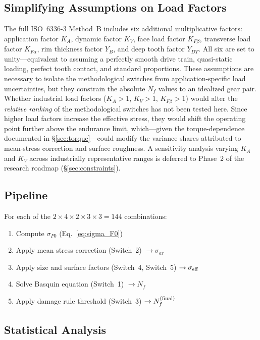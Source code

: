 \documentclass[12pt,a4paper]{article}
\begin{document}
\subsection{Simplifying Assumptions on Load Factors}

The full ISO~6336-3 Method~B includes six additional multiplicative
factors: application factor $K_A$, dynamic factor $K_V$, face load
factor $K_{F\beta}$, transverse load factor $K_{F\alpha}$, rim
thickness factor $Y_B$, and deep tooth factor $Y_{DT}$. All six are set
to unity---equivalent to assuming a perfectly smooth drive train,
quasi-static loading, perfect tooth contact, and standard proportions.
These assumptions are necessary to isolate the methodological switches
from application-specific load uncertainties, but they constrain the
absolute $N_f$ values to an idealized gear pair. Whether industrial load
factors ($K_A > 1$, $K_V > 1$, $K_{F\beta} > 1$) would alter the
\emph{relative ranking} of the methodological switches has not been
tested here. Since higher load factors increase the effective stress,
they would shift the operating point further above the endurance limit,
which---given the torque-dependence documented in
\S\ref{sec:torque}---could modify the variance shares attributed to
mean-stress correction and surface roughness. A sensitivity analysis
varying $K_A$ and $K_V$ across industrially representative ranges is
deferred to Phase~2 of the research roadmap (\S\ref{sec:constraints}).

\subsection{Pipeline}

For each of the $2\times4\times2\times3\times3 = 144$ combinations:
\begin{enumerate}
  \item Compute $\sigma_{F0}$ (Eq.~\ref{eq:sigma_F0})
  \item Apply mean stress correction (Switch~2) $\rightarrow \sigma_{ar}$
  \item Apply size and surface factors (Switch~4, Switch~5)
        $\rightarrow \sigma_{\rm eff}$
  \item Solve Basquin equation (Switch~1) $\rightarrow N_f$
  \item Apply damage rule threshold (Switch~3)
        $\rightarrow N_f^{\rm (final)}$
\end{enumerate}

\subsection{Statistical Analysis}
\end{document}
